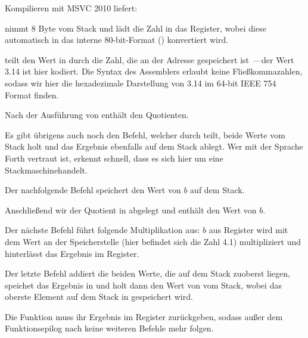 
Kompilieren mit MSVC 2010 liefert:



\FLD nimmt 8 Byte vom Stack und lädt die Zahl in das  Register, wobei
diese automatisch in das interne 80-bit-Format ()
konvertiert wird.

\FDIV teilt den Wert in  durch die Zahl, die an der Adresse
 gespeichert ist~---der Wert 3.14 ist hier
kodiert.
Die Syntax des Assemblers erlaubt keine Fließkommazahlen, sodass wir hier die
hexadezimale Darstellung von 3.14 im 64-bit IEEE 754 Format finden.

Nach der Ausführung von \FDIV enthält  den \gls{Quotienten}.

Es gibt übrigens auch noch den \FDIVP Befehl, welcher  durch 
teilt, beide Werte vom Stack holt und das Ergebnis ebenfalls auf dem Stack
ablegt.
Wer mit der Sprache Forth \FNURLFRTH vertraut ist, erkennt schnell, dass es sich
hier um eine Stackmaschine\FNURLSTACK handelt.

Der nachfolgende \FLD Befehl speichert den Wert von $b$ auf dem Stack.

Anschließend wir der Quotient in  abgelegt und  enthält den Wert von
$b$.

Der nächste \FMUL Befehl führt folgende Multiplikation aus: $b$ aus Register
 wird mit dem Wert an der Speicherstelle 
(hier befindet sich die Zahl 4.1) multipliziert und hinterlässt das Ergebnis im
 Register.

Der letzte \FADDP Befehl addiert die beiden Werte, die auf dem Stack zuoberst
liegen, speichet das Ergebnis in  und holt dann den Wert von  vom
Stack, wobei das oberste Element auf dem Stack in  gespeichert wird.

Die Funktion muss ihr Ergebnis im  Register zurückgeben, sodass außer dem
Funktionsepilog nach \FADDP keine weiteren Befehle mehr folgen.


